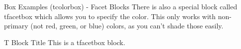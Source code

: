 \documentclass[aspectratio=1610]{beamer}
\begin{document}
\begin{frame}{Box Examples (tcolorbox) - Facet Blocks}
    There is also a special block called tfacetbox which allows you to specify the color. This only works with non-primary (not red, green, or blue) colors, as you can't shade those easily.
    \begin{tfacetbox}[nudarkyellow]{T Block Title}
        This is a tfacetbox block.
    \end{tfacetbox}
\end{frame}

\end{document}
